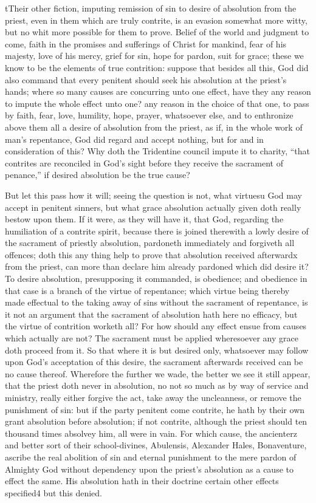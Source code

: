 tTheir other fiction, imputing remission of sin to desire of absolution from the priest, even in them which are truly contrite, is an evasion somewhat more witty, but no whit more possible for them to prove. Belief of the world and judgment to come, faith in the promises and sufferings of Christ for mankind, fear of his majesty, love of his mercy, grief for sin, hope for pardon, suit for grace; these we know to be the elements of true contrition: suppose that besides all this, God did also command that every penitent should seek his absolution at the priest’s hands; where so many causes are concurring unto one effect, have they any reason to impute the whole effect unto one? any reason in the choice of that one, to pass by faith, fear, love, humility, hope, prayer, whatsoever else, and to enthronize above them all a desire of absolution from the priest, as if, in the whole work of man’s repentance, God did regard and accept nothing, but for and in consideration of this? Why doth the Tridentine council impute it to charity, “that contrites are reconciled in God’s sight before they receive the sacrament of penance,” if desired absolution be the true cause?

But let this pass how it will; seeing the question is not, what virtuesu God may accept in penitent sinners, but what grace absolution actually given doth really bestow upon them. If it were, as they will have it, that God, regarding the humiliation of a contrite spirit, because there is joined therewith a lowly desire of the sacrament of priestly absolution, pardoneth immediately and forgiveth all offences; doth this any thing help to prove that absolution received afterwardx  from the priest, can more than declare him already pardoned which did desire it? To desire absolution, presupposing it commanded, is obedience; and obedience in that case is a branch of the virtue of repentance; which virtue being thereby made effectual to the taking away of sins without the sacrament of repentance, is it not an argument that the sacrament of absolution hath here no efficacy, but the virtue of contrition worketh all? For how should any effect ensue from causes which actually are not? The sacrament must be applied wheresoever any grace doth proceed from it. So that where it is but desired only, whatsoever may follow upon God’s acceptation of this desire, the sacrament afterwards received can be no cause thereof. Wherefore the further we wade, the better we see it still appear, that the priest doth never in absolution, no not so much as by way of service and ministry, really either forgive the act, take away the uncleanness, or remove the punishment of sin: but if the party penitent come contrite, he hath by their own grant absolution before absolution; if not contrite, although the priest should ten thousand times absolvey him, all were in vain. For which cause, the ancienterz and better sort of their school-divines, Abulensis, Alexander Hales, Bonaventure, ascribe the real abolition of sin and eternal punishment to the mere pardon of Almighty God without dependency upon the priest’s absolution as a cause to effect the same. His absolution hath in their doctrine certain other effects specified4 but this denied.


